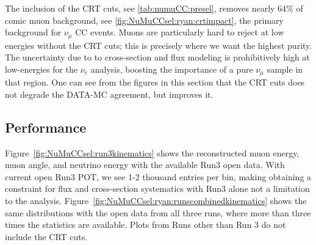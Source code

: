 \par The inclusion of the CRT cuts, see \cref{tab:numuCC:presel}, removes nearly 64$\%$ of comic muon background, see \cref{fig:NuMuCCsel:ryan:crtimpact}, the primary background for $\nu_{\mu}$ CC events. Muons are particularly hard to reject at low energies without the CRT cuts; this is precisely where we want the highest purity. The uncertainty due to to cross-section and flux modeling is prohibitively high at low-energies for the $\nu_e$ analysis, boosting the importance of a pure $\nu_{\mu}$ sample in that region. One can see from the figures in this section that the CRT cuts does not degrade the DATA-MC agreement, but improves it.

\subsection{Performance}
\label{sssec:NuMUCCsel:performance}
                    
\par Figure~\ref{fig:NuMuCCsel:run3kinematics} shows the reconstructed muon energy, muon angle, and neutrino energy with the available Run3 open data. With current open Run3 POT, we see 1-2 thousand entries per bin, making obtaining a constraint for flux and cross-section systematics with Run3 alone not a limitation to the analysis. Figure~\ref{fig:NuMuCCsel:ryan:runscombinedkinematics} shows the same distributions with the open data from all three runs, where more than three times the statistics are available. Plots from Runs other than Run 3 do not include the CRT cuts.

